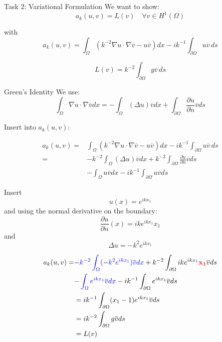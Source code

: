 \documentclass{beamer}
\begin{document}
\begin{frame}{Task 2: Variational Formulation}
We want to show:
\[
a_k(u,v) = L(v) \quad \forall v \in H^1(\Omega)
\]

with
\[
a_k(u,v) = \int_\Omega \left(k^{-2} \nabla u \cdot \nabla \overline{v} - u\overline{v}\right) dx
- ik^{-1} \int_{\partial \Omega} u\overline{v} \, ds
\]

\[
L(v) = k^{-2} \int_{\partial \Omega} g \overline{v} \, ds
\]

\end{frame}

\begin{frame}{Green's Identity}
We use:
\[
\int_\Omega \nabla u \cdot \nabla \overline{v} dx
= -\int_\Omega (\Delta u)\overline{v} dx
+ \int_{\partial \Omega} \frac{\partial u}{\partial n} \overline{v} ds
\]

Insert into $a_k(u,v)$:

\begin{align*}
a_k(u,v) = &\int_\Omega \left(k^{-2} \nabla u \cdot \nabla \overline{v} - u\overline{v}\right) dx
- ik^{-1} \int_{\partial \Omega} u\overline{v} \, ds\\
= &-k^{-2} \int_\Omega (\Delta u)\overline{v} dx
+ k^{-2} \int_{\partial \Omega} \frac{\partial u}{\partial n} \overline{v} ds \\
&- \int_\Omega u\overline{v} dx
- ik^{-1} \int_{\partial \Omega} u\overline{v} ds  
\end{align*}
\end{frame}


\begin{frame}{}
Insert \[u(x) = e^{ikx_1}\]
and using the normal derivative on the boundary:
\[
\frac{\partial u}{\partial n}(x) = ik e^{ikx_1} x_1
\]  and\[\Delta u = -k^2e^{ikx_1}\]

\begin{align*}
a_k(u,v)
=& \textcolor{blue}{-k^{-2} \int_\Omega (-k^2e^{ikx_1})\overline{v} dx}
+ k^{-2} \int_{\partial \Omega} ik e^{ikx_1}\textcolor{red}{\mathbf{ x_1}} \overline{v} ds
\\& \textcolor{blue}{- \int_\Omega e^{ikx_1}\overline{v} dx}
- ik^{-1} \int_{\partial \Omega} e^{ikx_1}\overline{v} ds\\
&= ik^{-1} \int_{\partial \Omega} (x_1 -1) e^{ikx_1}\overline{v} ds\\
&= ik^{-2} \int_{\partial \Omega} g\overline{v} ds\\
&= L(v)
\end{align*}
\end{frame}
\end{document}
